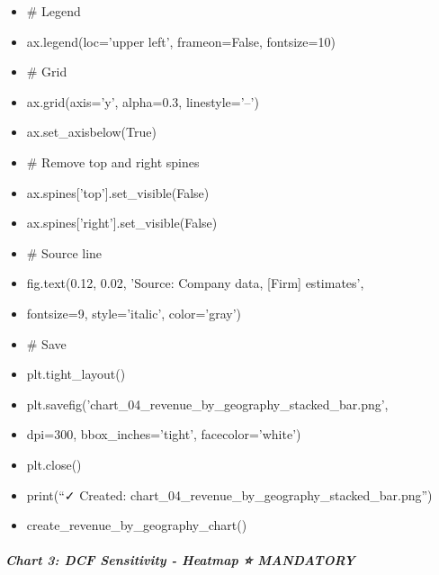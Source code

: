 \documentclass[11pt]{article}
\begin{document}
\begin{itemize}[leftmargin=*,itemsep=2pt,topsep=2pt]
\item {} \# Legend
\item {} ax.legend(loc='upper left', frameon=False, fontsize=10)
\item {} \# Grid
\item {} ax.grid(axis='y', alpha=0.3, linestyle='--')
\item {} ax.set\_\allowbreak{}axisbelow(True)
\item {} \# Remove top and right spines
\item {} ax.spines['top'].set\_\allowbreak{}visible(False)
\item {} ax.spines['right'].set\_\allowbreak{}visible(False)
\item {} \# Source line
\item {} fig.text(0.12, 0.02, 'Source: Company data, [Firm] estimates',
\item {} fontsize=9, style='italic', color='gray')
\item {} \# Save
\item {} plt.tight\_\allowbreak{}layout()
\item {} plt.savefig('chart\_\allowbreak{}04\_\allowbreak{}revenue\_\allowbreak{}by\_\allowbreak{}geography\_\allowbreak{}stacked\_\allowbreak{}bar.png',
\item {} dpi=300, bbox\_\allowbreak{}inches='tight', facecolor='white')
\item {} plt.close()
\item {} print(``✓ Created: chart\_\allowbreak{}04\_\allowbreak{}revenue\_\allowbreak{}by\_\allowbreak{}geography\_\allowbreak{}stacked\_\allowbreak{}bar.png'')
\item {} create\_\allowbreak{}revenue\_\allowbreak{}by\_\allowbreak{}geography\_\allowbreak{}chart()
\end{itemize}

\subparagraph{Chart 3: DCF Sensitivity - Heatmap ⭐ MANDATORY}\mbox{}\par
\end{document}
